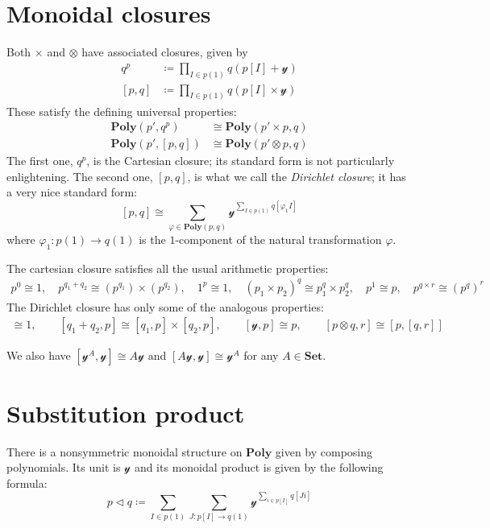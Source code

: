 \documentclass[11pt, one side, article]{memoir}
\theoremstyle{definition}
\theoremstyle{plain}
\newcommand{\Cat}[1]{\mathbf{#1}}%
\newcommand{\smset}{\Cat{Set}}
\newcommand{\yon}{\mathcal{y}}
\newcommand{\poly}{\Cat{Poly}}
\newcommand{\0}{\textsf{0}}
\newcommand{\1}{\tn{\textsf{1}}}
\newcommand{\tri}{\mathbin{\triangleleft}}
\begin{document}
\chapter{Monoidal closures}

Both $\times$ and $\otimes$ have associated closures, given by
\begin{align}
  q^p&\coloneqq \prod_{I\in p(1)}q(p[I]+\yon)\label{eqn.cart_cl}\\
  [p,q]&\coloneqq\prod_{I\in p(1)}q(p[I]\times\yon)
\end{align}
These satisfy the defining universal properties:
\begin{align}
  \poly(p',q^p)&\cong\poly(p'\times p,q)\\
  \poly(p',[p,q])&\cong\poly(p'\otimes p,q)
\end{align}
The first one, $q^p$, is the Cartesian closure; its standard form is not particularly enlightening. The second one, $[p,q]$, is what we call the \emph{Dirichlet closure}; it has a very nice standard form:
\[
[p,q]\cong\sum_{\varphi\in\poly(p,q)}\yon^{\sum\limits_{I\in p(1)}q[\varphi_1I]}
\]
where $\varphi_1\colon p(1)\to q(1)$ is the $1$-component of the natural transformation $\varphi$.

The cartesian closure satisfies all the usual arithmetic properties:
\begin{gather}
	p^0\cong1,\quad
	p^{q_1+q_2}\cong (p^{q_1})\times(p^{q_2}),\quad
	1^p\cong 1,\quad
	(p_1\times p_2)^q\cong p_1^q\times p_2^q,\quad
	p^1\cong p,\quad
	p^{q\times r}\cong (p^q)^r
\end{gather}
The Dirichlet closure has only some of the analogous properties:
\begin{gather}
	[0,p]\cong1,\qquad
	[q_1+q_2,p]\cong [q_1,p]\times[q_2,p],\qquad
	[\yon,p]\cong p,\qquad
	[p\otimes q,r]\cong[p,[q,r]]
\end{gather}

We also have $[\yon^A,\yon]\cong A\yon$ and $[A\yon,\yon]\cong\yon^A$ for any $A\in\smset$.


\chapter{Substitution product}

There is a nonsymmetric monoidal structure on $\poly$ given by composing polynomials. Its unit is $\yon$ and its monoidal product is given by the following formula:
\begin{equation}
p\tri q\coloneqq\sum_{I\in p(1)}\sum_{J\colon p[I]\to q(1)}\yon^{\sum\limits_{i\in p[I]}q[Ji]}
\end{equation}
\end{document}

